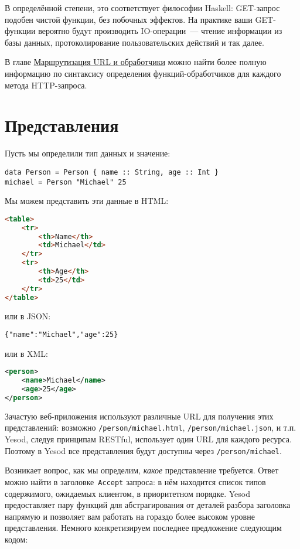 В определённой степени, это соответствует философии Haskell: GET-запрос подобен
чистой функции, без побочных эффектов. На практике ваши GET-функции вероятно
будут производить IO-операции~--- чтение информации из базы данных,
протоколирование пользовательских действий и так далее.

В главе \hyperref[chap:routing]{Маршрутизация URL и обработчики} можно найти
более полную информацию по синтаксису определения функций-обработчиков для
каждого метода HTTP-запроса.

\section{Представления}

Пусть мы определили тип данных и значение:

\begin{lstlisting}
data Person = Person { name :: String, age :: Int }
michael = Person "Michael" 25
\end{lstlisting}

Мы можем представить эти данные в HTML:
\begin{lstlisting}[language=HTML]
 <table>
    <tr>
        <th>Name</th>
        <td>Michael</td>
    </tr>
    <tr>
        <th>Age</th>
        <td>25</td>
    </tr>
</table>
\end{lstlisting}

или в JSON:

\begin{lstlisting}
{"name":"Michael","age":25}
\end{lstlisting}

или в XML:
\begin{lstlisting}[language=XML]
<person>
    <name>Michael</name>
    <age>25</age>
</person>
\end{lstlisting}

Зачастую веб-приложения используют различные URL для получения этих
представлений: возможно \texttt{/person/michael.html},
\texttt{/person/michael.json}, и т.п. Yesod, следуя принципам RESTful,
использует один URL для каждого ресурса. Поэтому в Yesod все представления
будут доступны через \texttt{/person/michael}.

Возникает вопрос, как мы определим, \emph{какое} представление требуется. Ответ
можно найти в заголовке~\texttt{Accept} запроса: в нём находится список типов
содержимого, ожидаемых клиентом, в приоритетном порядке. Yesod предоставляет
пару функций для абстрагирования от деталей разбора заголовка напрямую и
позволяет вам работать на гораздо более высоком уровне представления.  Немного
конкретизируем последнее предложение следующим кодом:

